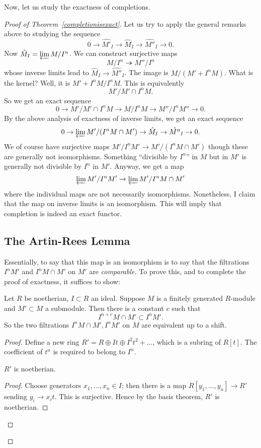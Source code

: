 Now, let us study the exactness of completions.
\begin{proof}[Proof of Theorem~\ref{completionisexact}]

Let us try to apply the general remarks above to studying the sequence 
\[ 0 \to \hat{M'}_I \to \hat{M}_I \to \hat{M''}_I \to 0.  \]
Now $\hat{M}_I = \varprojlim M/I^n$. We can construct  surjective maps
\[ M/I^n \twoheadrightarrow M''/I^n  \]
whose inverse limits lead to $\hat{M}_I \to \hat{M''}_I$. The image is
$M/(M' + I^n M)$. What is the kernel?
Well, it is $M' + I^n M/ I^n M$.  This is equivalently
\[ M'/M' \cap I^n M.  \]
So we get an exact sequence
\[ 0 \to M'/M' \cap I^n M \to M/I^n M \to M''/I^n M'' \to 0.  \]
By the above analysis of exactness of inverse limits, we get an exact sequence
\[ 0 \to \varprojlim M'/(I^n M \cap M') \to \hat{M}_I \to \hat{M''}_I \to 0.  \]
We of course have surjective maps $M'/I^n M' \to M'/(I^n M \cap M') $ though
these are generally not isomorphisms. Something ``divisible by $I^n$'' in $M$ but
in $M'$ is generally not divisible by $I^n$ in $M'$.
Anyway, we get a map
\[ \varprojlim M'/I^n M' \to \varprojlim M'/I^n M \cap M'  \]
where the individual maps are not necessarily isomorphisms. Nonetheless, I
claim that the map on inverse limits is an isomorphism. This will imply that
completion is indeed an exact functor.


\subsection{The Artin-Rees Lemma}
Essentially, to say that this map is an isomorphism is to say that the
filtrations $I^n M'$ and $I^n M \cap M'$ on $M'$ are \emph{comparable.} To
prove this, and to complete the proof of exactness, it suffices to show:
\begin{proposition} Let $R$ be noetherian, $I \subset R$ an
ideal. Suppose $M$ is a finitely generated $R$-module and $M' \subset M$ a submodule. Then
there is a  constant $c$ such that
\[ I^{n+c} M \cap M' \subset I^n M'.  \]
So the two filtrations $I^n M \cap M', I^n M'$ on $M$ are equivalent up to a
shift.
\end{proposition} 
\begin{proof} 
Define a new ring $R' = R \oplus It \oplus I^2 t^2 + \dots$, which is a subring of
$R[t]$. The coefficient of $t^n $ is required to belong to $I^n$. 

\begin{lemma} 
$R'$ is noetherian.
\end{lemma} 
\begin{proof} 
Choose generators $x_1, \dots, x_n \in I$; then there is a map $R[y_1, \dots,
y_n] \to R'$ sending $y_i \to x_i t$. This is surjective. Hence by the basis
theorem, $R'$ is noetherian.
\end{proof} 


\end{proof}
\end{proof}
